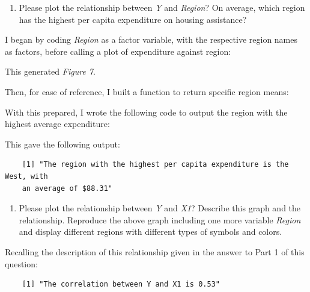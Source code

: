 \documentclass[12pt,letterpaper]{article}
\begin{document}
\vspace{.5cm}

\begin{enumerate}
	\setcounter{enumi} 1
	\item
	Please plot the relationship between \emph{Y} and \emph{Region}? On average, which region has the highest per capita expenditure on housing assistance?
\end{enumerate}

I began by coding \emph{Region} as a factor variable, with the respective region names as factors, before calling a plot of expenditure against region:

 

This generated \emph{Figure 7}.

\vspace{.25cm}

Then, for ease of reference, I built a function to return specific region means:

 

With this prepared, I wrote the following code to output the region with the highest average expenditure:

 

This gave the following output:

\begin{verbatim}
	[1] "The region with the highest per capita expenditure is the West, with 
	an average of $88.31"
\end{verbatim}

\vspace{.5cm}

\begin{enumerate}
	\setcounter{enumi} 2
	\item
	Please plot the relationship between \emph{Y} and \emph{X1}? Describe this graph and the relationship. Reproduce the above graph including one more variable \emph{Region} and display different regions with different types of symbols and colors.
\end{enumerate}

Recalling the description of this relationship given in the answer to Part 1 of this question:

\begin{verbatim}
	[1] "The correlation between Y and X1 is 0.53"
\end{verbatim}
\end{document}
